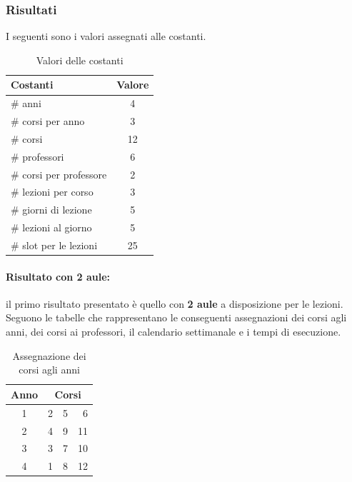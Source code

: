 \documentclass[a4paper,oneside,12pt]{book}
\begin{document}
    \subsubsection*{Risultati}
    I seguenti sono i valori assegnati alle costanti.
    \begin{table}[h]
        \centering
        \begin{tabular}{|l | c |}
            \hline
            Costanti &Valore\\ %
            \hline
            \# anni &4\\
            \# corsi per anno &3\\
            \# corsi &12\\
            \# professori &6\\
            \# corsi per professore &2\\
            \# lezioni per corso &3\\
            \# giorni di lezione &5\\
            \# lezioni al giorno &5\\
            \# slot per le lezioni &25\\
            \hline
        \end{tabular}
        \caption{Valori delle costanti}
    \end{table}

    \FloatBarrier
    \paragraph{Risultato con 2 aule:}il primo risultato presentato è quello con \textbf{2 aule} a disposizione per le lezioni. Seguono le tabelle che rappresentano le conseguenti assegnazioni dei corsi agli anni, dei corsi ai professori,  il calendario settimanale e i tempi di esecuzione.
    \begin{table}[h]
        \centering
        \begin{tabular}{|c | r r r|}
            \hline
            Anno &\multicolumn{3}{c|}{Corsi}\\ %
            \hline
            1 &2&5&6\\
            2 &4&9&11\\
            3 &3&7&10\\
            4 &1&8&12\\



            \hline
        \end{tabular}
        \caption{Assegnazione dei corsi agli anni}
    \end{table}
\end{document}

